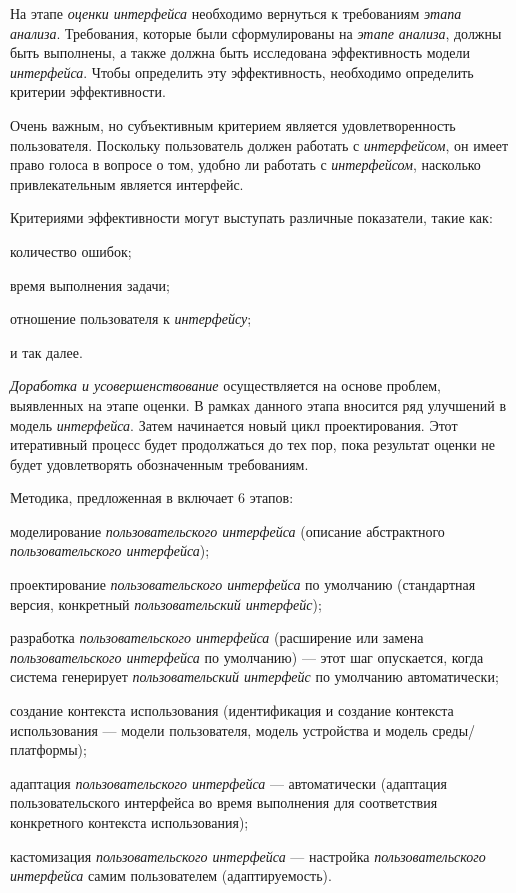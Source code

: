 На этапе \textit{оценки интерфейса} необходимо вернуться к требованиям \textit{этапа анализа}. Требования, которые были сформулированы на \textit{этапе анализа}, должны быть выполнены, а также должна быть исследована эффективность модели \textit{интерфейса}. Чтобы определить эту эффективность, необходимо определить критерии эффективности.

Очень важным, но субъективным критерием является удовлетворенность пользователя. Поскольку пользователь должен работать с \textit{интерфейсом}, он имеет право голоса в вопросе о том, удобно ли работать с \textit{интерфейсом}, насколько привлекательным является интерфейс.

Критериями эффективности могут выступать различные показатели, такие как:
\begin{textitemize}
	\item количество ошибок;
	\item время выполнения задачи;
	\item отношение пользователя к \textit{интерфейсу};
	\item и так далее.
\end{textitemize}

\textit{Доработка и усовершенствование} осуществляется на основе проблем, выявленных на этапе оценки. В рамках данного этапа вносится ряд улучшений в модель \textit{интерфейса}. Затем начинается новый цикл проектирования. Этот итеративный процесс будет продолжаться до тех пор, пока результат оценки не будет удовлетворять обозначенным требованиям. 

Методика, предложенная в  включает 6 этапов:
\begin{textitemize}
	\item моделирование \textit{пользовательского интерфейса} (описание абстрактного \textit{пользовательского интерфейса});
	\item проектирование \textit{пользовательского интерфейса} по умолчанию (стандартная версия, конкретный \textit{пользовательский интерфейс});
	\item разработка \textit{пользовательского интерфейса} (расширение или замена \textit{пользовательского интерфейса} по умолчанию) --- этот шаг опускается, когда система генерирует \textit{пользовательский интерфейс} по умолчанию автоматически;
	\item создание контекста использования (идентификация и создание контекста использования --- модели пользователя, модель устройства и модель среды/платформы);
	\item адаптация \textit{пользовательского интерфейса} --- автоматически (адаптация пользовательского интерфейса во время выполнения для соответствия конкретного контекста использования);
	\item кастомизация \textit{пользовательского интерфейса} --- настройка \textit{пользовательского интерфейса} самим пользователем (адаптируемость).
\end{textitemize}

